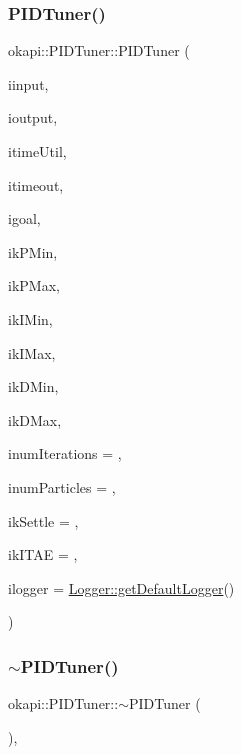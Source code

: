 \subsubsection{\texorpdfstring{PIDTuner()}{PIDTuner()}}
{\footnotesize\ttfamily okapi\+::\+P\+I\+D\+Tuner\+::\+P\+I\+D\+Tuner (\begin{DoxyParamCaption}\item[{const std\+::shared\+\_\+ptr$<$ \mbox{\hyperlink{classokapi_1_1ControllerInput}{Controller\+Input}}$<$ double $>$$>$ \&}]{iinput,  }\item[{const std\+::shared\+\_\+ptr$<$ \mbox{\hyperlink{classokapi_1_1ControllerOutput}{Controller\+Output}}$<$ double $>$$>$ \&}]{ioutput,  }\item[{const \mbox{\hyperlink{classokapi_1_1TimeUtil}{Time\+Util}} \&}]{itime\+Util,  }\item[{Q\+Time}]{itimeout,  }\item[{std\+::int32\+\_\+t}]{igoal,  }\item[{double}]{ik\+P\+Min,  }\item[{double}]{ik\+P\+Max,  }\item[{double}]{ik\+I\+Min,  }\item[{double}]{ik\+I\+Max,  }\item[{double}]{ik\+D\+Min,  }\item[{double}]{ik\+D\+Max,  }\item[{std\+::size\+\_\+t}]{inum\+Iterations = {},  }\item[{std\+::size\+\_\+t}]{inum\+Particles = {},  }\item[{double}]{ik\+Settle = {},  }\item[{double}]{ik\+I\+T\+AE = {},  }\item[{const std\+::shared\+\_\+ptr$<$ \mbox{\hyperlink{classokapi_1_1Logger}{Logger}} $>$ \&}]{ilogger = {\ttfamily \mbox{\hyperlink{classokapi_1_1Logger_a5053cf778b4b55acba788a3797dc96d2}{Logger\+::get\+Default\+Logger}}()} }\end{DoxyParamCaption})}

\mbox{\label{classokapi_1_1PIDTuner_a7583fde6cec427e875f75dc33e2bf00f}} 
\subsubsection{\texorpdfstring{$\sim$PIDTuner()}{~PIDTuner()}}
{\footnotesize\ttfamily okapi\+::\+P\+I\+D\+Tuner\+::$\sim$\+P\+I\+D\+Tuner (\begin{DoxyParamCaption}{ }\end{DoxyParamCaption})\hspace{0.3cm}{\ttfamily [virtual]}, {\ttfamily [default]}}



